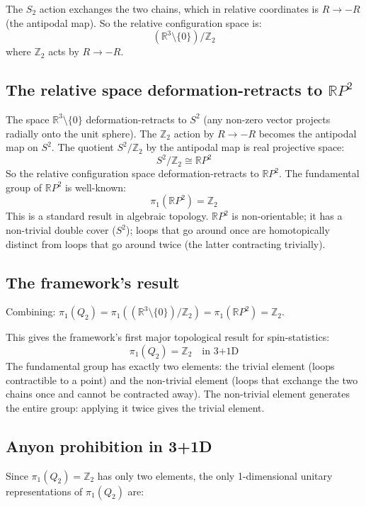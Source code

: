 \documentclass[11pt,a4paper]{article}
\begin{document}
The $S_2$ action exchanges the two chains, which in relative coordinates is $R \to -R$ (the antipodal map). So the relative configuration space is:
\[
(\mathbb{R}^{3} \setminus \{0\}) / \mathbb{Z}_2
\]
where $\mathbb{Z}_2$ acts by $R \to -R$.

\subsection{The relative space deformation-retracts to $\mathbb{R}P^{2}$}

The space $\mathbb{R}^{3} \setminus \{0\}$ deformation-retracts to $S^{2}$ (any non-zero vector projects radially onto the unit sphere). The $\mathbb{Z}_2$ action by $R \to -R$ becomes the antipodal map on $S^{2}$. The quotient $S^{2} / \mathbb{Z}_2$ by the antipodal map is real projective space:
\[
S^{2} / \mathbb{Z}_2 \cong \mathbb{R}P^{2}
\]
So the relative configuration space deformation-retracts to $\mathbb{R}P^{2}$. The fundamental group of $\mathbb{R}P^{2}$ is well-known:
\[
\pi_1(\mathbb{R}P^{2}) = \mathbb{Z}_2
\]
This is a standard result in algebraic topology. $\mathbb{R}P^{2}$ is non-orientable; it has a non-trivial double cover ($S^{2}$); loops that go around once are homotopically distinct from loops that go around twice (the latter contracting trivially).

\subsection{The framework's result}

Combining: $\pi_1(Q_2) = \pi_1((\mathbb{R}^{3} \setminus \{0\})/\mathbb{Z}_2) = \pi_1(\mathbb{R}P^{2}) = \mathbb{Z}_2$.

This gives the framework's first major topological result for spin-statistics:
\[
\pi_1(Q_2) = \mathbb{Z}_2 \quad \text{in 3+1D}
\]
The fundamental group has exactly two elements: the trivial element (loops contractible to a point) and the non-trivial element (loops that exchange the two chains once and cannot be contracted away). The non-trivial element generates the entire group: applying it twice gives the trivial element.

\subsection{Anyon prohibition in 3+1D}

Since $\pi_1(Q_2) = \mathbb{Z}_2$ has only two elements, the only 1-dimensional unitary representations of $\pi_1(Q_2)$ are:
\end{document}

